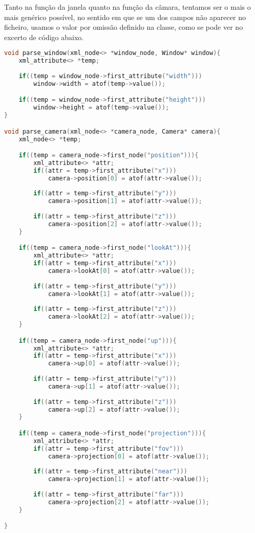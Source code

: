 \documentclass[14pt, a4 paper]{report}
\begin{document}
Tanto na função da janela quanto na função da câmara, tentamos ser o mais o mais genérico possível, no sentido em que se um dos campos não aparecer no ficheiro, usamos o valor por omissão definido na classe, como se pode ver no excerto de código abaixo.
\begin{lstlisting}[language = c++]
void parse_window(xml_node<> *window_node, Window* window){
    xml_attribute<> *temp;
    
    if((temp = window_node->first_attribute("width")))
        window->width = atof(temp->value());

    if((temp = window_node->first_attribute("height")))
        window->height = atof(temp->value());
}

void parse_camera(xml_node<> *camera_node, Camera* camera){
    xml_node<> *temp;

    if((temp = camera_node->first_node("position"))){
        xml_attribute<> *attr;
        if((attr = temp->first_attribute("x")))
            camera->position[0] = atof(attr->value());
        
        if((attr = temp->first_attribute("y")))
            camera->position[1] = atof(attr->value());
        
        if((attr = temp->first_attribute("z")))
            camera->position[2] = atof(attr->value());
    }

    if((temp = camera_node->first_node("lookAt"))){
        xml_attribute<> *attr;
        if((attr = temp->first_attribute("x")))
            camera->lookAt[0] = atof(attr->value());
        
        if((attr = temp->first_attribute("y")))
            camera->lookAt[1] = atof(attr->value());
        
        if((attr = temp->first_attribute("z")))
            camera->lookAt[2] = atof(attr->value());
    }

    if((temp = camera_node->first_node("up"))){
        xml_attribute<> *attr;
        if((attr = temp->first_attribute("x")))
            camera->up[0] = atof(attr->value());
        
        if((attr = temp->first_attribute("y")))
            camera->up[1] = atof(attr->value());
        
        if((attr = temp->first_attribute("z")))
            camera->up[2] = atof(attr->value());
    }

    if((temp = camera_node->first_node("projection"))){
        xml_attribute<> *attr;
        if((attr = temp->first_attribute("fov")))
            camera->projection[0] = atof(attr->value());
        
        if((attr = temp->first_attribute("near")))
            camera->projection[1] = atof(attr->value());
        
        if((attr = temp->first_attribute("far")))
            camera->projection[2] = atof(attr->value());
    }

}
\end{lstlisting}
\end{document}
